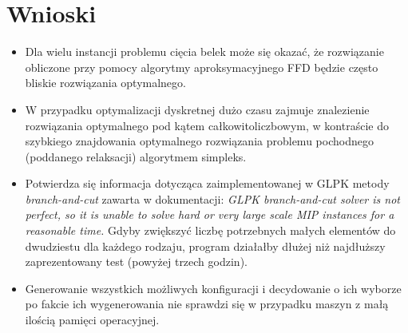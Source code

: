 \section{Wnioski}

\begin{itemize}
	\item Dla wielu instancji problemu cięcia belek może się okazać, że rozwiązanie obliczone przy pomocy algorytmy aproksymacyjnego FFD będzie często bliskie rozwiązania optymalnego.
	\item W przypadku optymalizacji dyskretnej dużo czasu zajmuje znalezienie rozwiązania optymalnego pod kątem całkowitoliczbowym, w kontraście do szybkiego znajdowania optymalnego rozwiązania problemu pochodnego (poddanego relaksacji) algorytmem simpleks.
	\item Potwierdza się informacja dotycząca zaimplementowanej w GLPK metody  \textit{branch-and-cut} zawarta w dokumentacji: \textit{GLPK branch-and-cut solver is not perfect, so it is unable to solve hard or very large scale MIP instances for a reasonable time.} Gdyby zwiększyć liczbę potrzebnych małych elementów do dwudziestu dla każdego rodzaju, program działałby dłużej niż najdłuższy zaprezentowany test (powyżej trzech godzin).
	\item Generowanie wszystkich możliwych konfiguracji i decydowanie o ich wyborze po fakcie ich wygenerowania nie sprawdzi się w przypadku maszyn z małą ilością pamięci operacyjnej.
\end{itemize}







